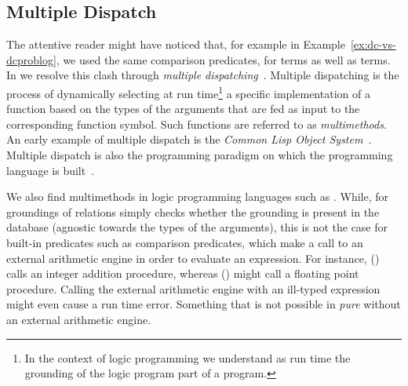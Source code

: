 



\subsection{Multiple Dispatch} \label{ref:multiple_dispatch}
The attentive reader might have noticed that, for example in Example~\ref{ex:dc-vs-dcproblog}, we used the same comparison predicates, for  terms as well as  terms. In \dcproblogsty we resolve this clash through {\em multiple dispatching}~\citep{castagna1995calculus}.
Multiple dispatching is the process of dynamically selecting at run time\footnote{In the context of logic programming we understand as run time the grounding of the logic program part of a \dcproblogsty program.} a specific implementation of a function based on the types of the arguments that are fed as input to the corresponding function symbol.
Such functions are referred to as {\em multimethods}. 
An early example of multiple dispatch is the {\em Common Lisp Object System}~\citep{keene1989object}. Multiple dispatch is also the programming paradigm on which the \juliasty programming language is built~\citep{bezanson2017julia}.

We also find multimethods in logic programming languages such as \prologsty. While, for groundings of relations \prologsty simply checks whether the grounding is present in the database (agnostic towards the types of the arguments), this is not the case for built-in predicates such as comparison predicates, which make a call to an external arithmetic engine in order to evaluate an expression. For instance, () calls an integer addition procedure, whereas () might call a floating point procedure. Calling the external arithmetic engine with an ill-typed expression might even cause a run time error. Something that is not possible in {\em pure} \prologsty without an external arithmetic engine.

